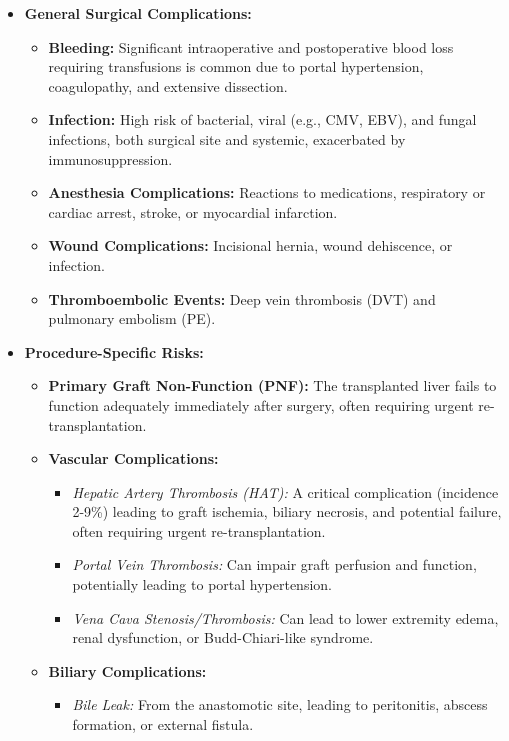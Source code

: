 \begin{itemize}
  \item \textbf{General Surgical Complications:}
    \begin{itemize}
      \item \textbf{Bleeding:} Significant intraoperative and postoperative blood loss requiring transfusions is common due to portal hypertension, coagulopathy, and extensive dissection.
      \item \textbf{Infection:} High risk of bacterial, viral (e.g., CMV, EBV), and fungal infections, both surgical site and systemic, exacerbated by immunosuppression.
      \item \textbf{Anesthesia Complications:} Reactions to medications, respiratory or cardiac arrest, stroke, or myocardial infarction.
      \item \textbf{Wound Complications:} Incisional hernia, wound dehiscence, or infection.
      \item \textbf{Thromboembolic Events:} Deep vein thrombosis (DVT) and pulmonary embolism (PE).
    \end{itemize}
  \item \textbf{Procedure-Specific Risks:}
    \begin{itemize}
      \item \textbf{Primary Graft Non-Function (PNF):} The transplanted liver fails to function adequately immediately after surgery, often requiring urgent re-transplantation.
      \item \textbf{Vascular Complications:}
        \begin{itemize}
          \item \textit{Hepatic Artery Thrombosis (HAT):} A critical complication (incidence 2-9\%) leading to graft ischemia, biliary necrosis, and potential failure, often requiring urgent re-transplantation.
          \item \textit{Portal Vein Thrombosis:} Can impair graft perfusion and function, potentially leading to portal hypertension.
          \item \textit{Vena Cava Stenosis/Thrombosis:} Can lead to lower extremity edema, renal dysfunction, or Budd-Chiari-like syndrome.
        \end{itemize}
      \item \textbf{Biliary Complications:}
        \begin{itemize}
          \item \textit{Bile Leak:} From the anastomotic site, leading to peritonitis, abscess formation, or external fistula.

\end{itemize}
\end{itemize}
\end{itemize}
